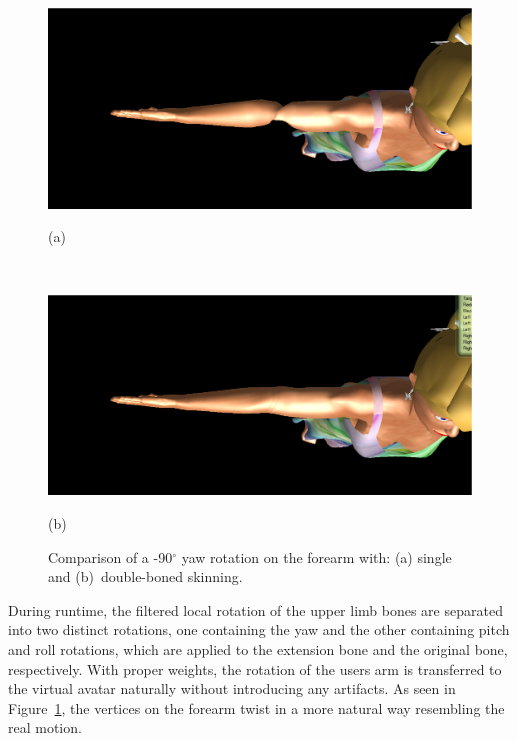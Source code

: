 \begin{figure}[htbp]
	\centerline{\includegraphics[width=1.0\columnwidth]{./figures/fore-arm-single-bone.eps}}
	\centerline{(a)}
	\centerline{\ }
	\centerline{\includegraphics[width=1.0\columnwidth]{./figures/fore-arm-double-bone.eps}}
	\centerline{(b)}
	\caption{Comparison of a -90$^\circ$ yaw rotation on the forearm with: (a) single and (b)~double-boned skinning.}
	\label{fig:forearm-comparison}
\end{figure}

During runtime, the filtered local rotation of the upper limb bones are separated into two distinct rotations, one containing the yaw and the other containing pitch and roll rotations, which are applied to the extension bone and the original bone, respectively. With proper weights, the rotation of the users arm is transferred to the virtual avatar naturally without introducing any artifacts. As seen in Figure~\ref{fig:forearm-comparison}, the vertices on the forearm twist in a more natural way resembling the real motion.


